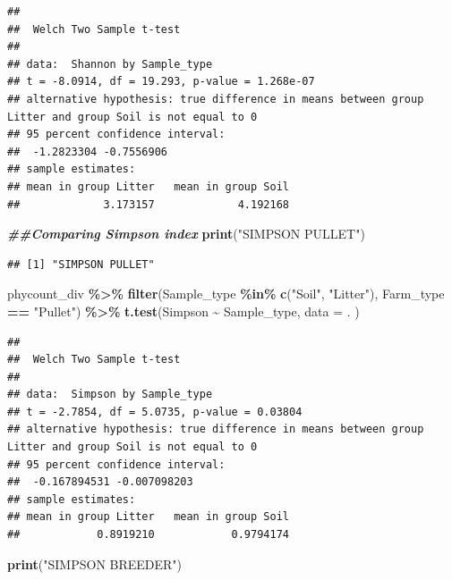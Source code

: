 \documentclass[
]{article}
\newenvironment{Shaded}{\begin{snugshade}}{\end{snugshade}}
\newcommand{\AttributeTok}[1]{\textcolor[rgb]{0.13,0.29,0.53}{#1}}
\newcommand{\DocumentationTok}[1]{\textcolor[rgb]{0.56,0.35,0.01}{\textbf{\textit{#1}}}}
\newcommand{\FunctionTok}[1]{\textcolor[rgb]{0.13,0.29,0.53}{\textbf{#1}}}
\newcommand{\NormalTok}[1]{#1}
\newcommand{\SpecialCharTok}[1]{\textcolor[rgb]{0.81,0.36,0.00}{\textbf{#1}}}
\newcommand{\StringTok}[1]{\textcolor[rgb]{0.31,0.60,0.02}{#1}}
\begin{document}
\begin{verbatim}
## 
##  Welch Two Sample t-test
## 
## data:  Shannon by Sample_type
## t = -8.0914, df = 19.293, p-value = 1.268e-07
## alternative hypothesis: true difference in means between group Litter and group Soil is not equal to 0
## 95 percent confidence interval:
##  -1.2823304 -0.7556906
## sample estimates:
## mean in group Litter   mean in group Soil 
##             3.173157             4.192168
\end{verbatim}

\begin{Shaded}
\begin{Highlighting}[]
\DocumentationTok{\#\#Comparing Simpson index}
\FunctionTok{print}\NormalTok{(}\StringTok{"SIMPSON PULLET"}\NormalTok{)}
\end{Highlighting}
\end{Shaded}

\begin{verbatim}
## [1] "SIMPSON PULLET"
\end{verbatim}

\begin{Shaded}
\begin{Highlighting}[]
\NormalTok{phycount\_div }\SpecialCharTok{\%\textgreater{}\%}
  \FunctionTok{filter}\NormalTok{(Sample\_type }\SpecialCharTok{\%in\%} \FunctionTok{c}\NormalTok{(}\StringTok{"Soil"}\NormalTok{, }\StringTok{"Litter"}\NormalTok{),}
\NormalTok{         Farm\_type }\SpecialCharTok{==} \StringTok{"Pullet"}\NormalTok{) }\SpecialCharTok{\%\textgreater{}\%}
  \FunctionTok{t.test}\NormalTok{(Simpson }\SpecialCharTok{\textasciitilde{}}\NormalTok{ Sample\_type, }
       \AttributeTok{data =}\NormalTok{ .}
\NormalTok{       )}
\end{Highlighting}
\end{Shaded}

\begin{verbatim}
## 
##  Welch Two Sample t-test
## 
## data:  Simpson by Sample_type
## t = -2.7854, df = 5.0735, p-value = 0.03804
## alternative hypothesis: true difference in means between group Litter and group Soil is not equal to 0
## 95 percent confidence interval:
##  -0.167894531 -0.007098203
## sample estimates:
## mean in group Litter   mean in group Soil 
##            0.8919210            0.9794174
\end{verbatim}

\begin{Shaded}
\begin{Highlighting}[]
\FunctionTok{print}\NormalTok{(}\StringTok{"SIMPSON BREEDER"}\NormalTok{)}
\end{Highlighting}
\end{Shaded}
\end{document}
